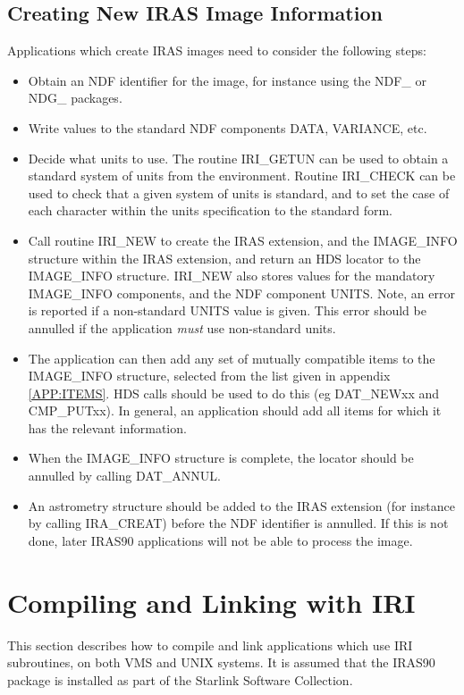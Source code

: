 \subsection{Creating New IRAS Image Information}
Applications which create IRAS images need to consider the following
steps:
\begin{itemize}

\item Obtain an NDF identifier for the image, for instance using the NDF\_ or 
NDG\_ packages.

\item Write values to the standard NDF components DATA, VARIANCE, etc.

\item Decide what units to use. The routine IRI\_GETUN can be used to obtain a 
standard system of units from the environment. Routine IRI\_CHECK can be used to 
check that a given system of units is standard, and to set the case of each 
character within the units specification to the standard form.

\item Call routine IRI\_NEW to create the IRAS extension, and the IMAGE\_INFO
structure within the IRAS extension, and return an HDS locator to the
IMAGE\_INFO structure. IRI\_NEW also stores values for the mandatory IMAGE\_INFO
components, and the NDF component UNITS. Note, an error is reported if a
non-standard UNITS value is given. This error should be annulled if the
application {\em must} use non-standard units. 

\item The application can then add any set of mutually compatible
items to the IMAGE\_INFO structure, selected from the list given in appendix 
\ref{APP:ITEMS}. HDS calls should be used to do this (eg DAT\_NEWxx and
CMP\_PUTxx). In general, an application should add all items for which it has
the relevant information. 

\item When the IMAGE\_INFO structure is complete, the
locator should be annulled by calling DAT\_ANNUL.

\item An astrometry structure should be added to the IRAS extension (for
instance by calling IRA\_CREAT) before the NDF identifier is annulled. If this
is not done, later IRAS90 applications will not be able to process the image. 

\end{itemize}

\section {Compiling and Linking with IRI}
\label{SEC:LINK}
This section describes how to compile and link applications which use IRI
subroutines, on both VMS and UNIX systems. It is assumed that the IRAS90 package
is installed as part of the Starlink Software Collection. 

